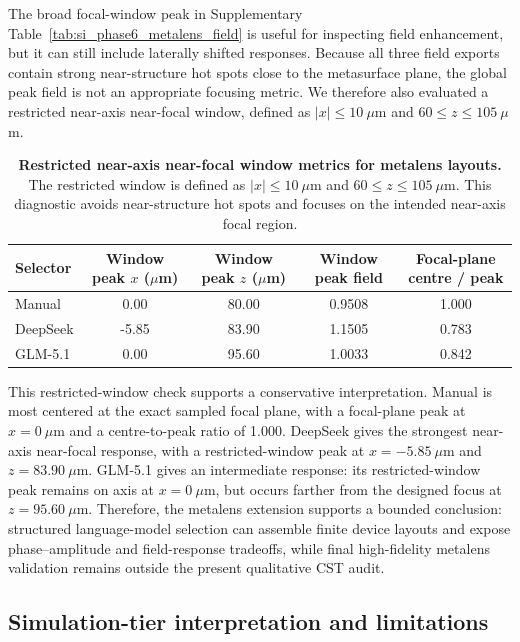 \documentclass[final,1p,times]{elsarticle}
\begin{document}
The broad focal-window peak in Supplementary Table~\ref{tab:si_phase6_metalens_field} is useful for inspecting field enhancement, but it can still include laterally shifted responses. Because all three field exports contain strong near-structure hot spots close to the metasurface plane, the global peak field is not an appropriate focusing metric. We therefore also evaluated a restricted near-axis near-focal window, defined as $|x|\leq 10~\mu$m and $60\leq z\leq105~\mu$m.

\begin{table}[htbp!]
\centering
\caption{\textbf{Restricted near-axis near-focal window metrics for metalens layouts.}
The restricted window is defined as $|x|\leq 10~\mu$m and $60\leq z\leq105~\mu$m. This diagnostic avoids near-structure hot spots and focuses on the intended near-axis focal region.}
\label{tab:si_phase6_metalens_restricted_window}
\small
\setlength{\tabcolsep}{4.5pt}
\renewcommand{\arraystretch}{1.12}
\begin{tabular}{lcccc}
\toprule
Selector & Window peak $x$ ($\mu$m) & Window peak $z$ ($\mu$m) & Window peak field & Focal-plane centre / peak \\
\midrule
Manual & 0.00 & 80.00 & 0.9508 & 1.000 \\
DeepSeek & -5.85 & 83.90 & 1.1505 & 0.783 \\
GLM-5.1 & 0.00 & 95.60 & 1.0033 & 0.842 \\
\bottomrule
\end{tabular}
\end{table}

This restricted-window check supports a conservative interpretation. Manual is most centered at the exact sampled focal plane, with a focal-plane peak at $x=0~\mu$m and a centre-to-peak ratio of 1.000. DeepSeek gives the strongest near-axis near-focal response, with a restricted-window peak at $x=-5.85~\mu$m and $z=83.90~\mu$m. GLM-5.1 gives an intermediate response: its restricted-window peak remains on axis at $x=0~\mu$m, but occurs farther from the designed focus at $z=95.60~\mu$m. Therefore, the metalens extension supports a bounded conclusion: structured language-model selection can assemble finite device layouts and expose phase--amplitude and field-response tradeoffs, while final high-fidelity metalens validation remains outside the present qualitative CST audit.

\subsection{Simulation-tier interpretation and limitations}
\end{document}
